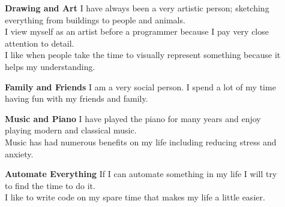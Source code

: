 
\begin{description}
  \item[] \textbf{Drawing and Art} \newline
  I have always been a very artistic person; sketching everything from buildings to people and animals. \\
  I view myself as an artist before a programmer because I pay very close attention to detail. \\
  I like when people take the time to visually represent something because it helps my understanding.
  \item[] \textbf{Family and Friends} \newline
  I am a very social person.  I spend a lot of my time having fun with my friends and family.
  \item[] \textbf{Music and Piano} \newline
  I have played the piano for many years and enjoy playing modern and classical music. \\
  Music has had numerous benefits on my life including reducing stress and anxiety.
  \item[] \textbf{Automate Everything} \newline
  If I can automate something in my life I will try to find the time to do it. \\
  I like to write code on my spare time that makes my life a little easier.
\end{description}

